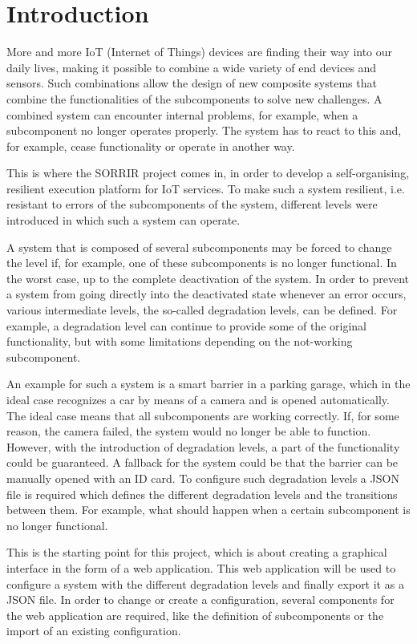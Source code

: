 \chapter{Introduction}
\label{sec:intro}

More and more IoT (Internet of Things) devices are finding their way into our daily lives, making it possible to combine a wide variety of end devices and sensors. Such combinations allow the design of new composite systems that combine the functionalities of the subcomponents to solve new challenges. A combined system can encounter internal problems, for example, when a subcomponent no longer operates properly. The system has to react to this and, for example, cease functionality or operate in another way.

This is where the SORRIR project comes in, in order to develop a self-organising, resilient execution platform for IoT services. To make such a system resilient, i.e. resistant to errors of the subcomponents of the system, different levels were introduced in which such a system can operate. 

A system that is composed of several subcomponents may be forced to change the level if, for example, one of these subcomponents is no longer functional. In the worst case, up to the complete deactivation of the system. In order to prevent a system from going directly into the deactivated state whenever an error occurs, various intermediate levels, the so-called degradation levels, can be defined. For example, a degradation level can continue to provide some of the original functionality, but with some limitations depending on the not-working subcomponent.

An example for such a system is a smart barrier in a parking garage, which in the ideal case recognizes a car by means of a camera and is opened automatically. The ideal case means that all subcomponents are working correctly. If, for some reason, the camera failed, the system would no longer be able to function. However, with the introduction of degradation levels, a part of the functionality could be guaranteed. A fallback for the system could be that the barrier can be manually opened with an ID card. To configure such degradation levels a JSON file is required which defines the different degradation levels and the transitions between them. For example, what should happen when a certain subcomponent is no longer functional.

This is the starting point for this project, which is about creating a graphical interface in the form of a web application. This web application will be used to configure a system with the different degradation levels and finally export it as a JSON file. In order to change or create a configuration, several components for the web application are required, like the definition of subcomponents or the import of an existing configuration. 

